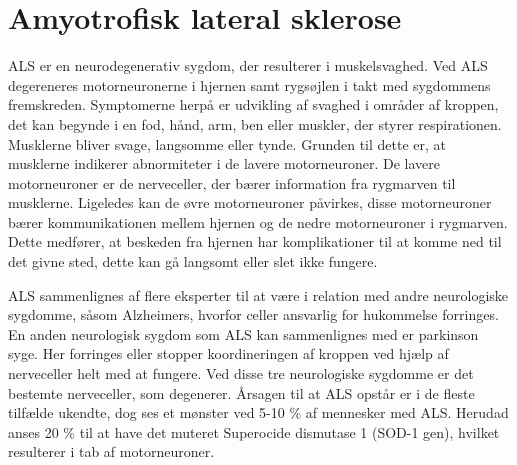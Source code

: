 \chapter{Amyotrofisk lateral sklerose}
ALS er en neurodegenerativ sygdom, der resulterer i muskelsvaghed. Ved ALS degereneres motorneuronerne i hjernen samt rygsøjlen i takt med sygdommens fremskreden. Symptomerne herpå er udvikling af svaghed i områder af kroppen, det kan begynde i en fod, hånd, arm, ben eller muskler, der styrer respirationen. Musklerne bliver svage, langsomme eller tynde. Grunden til dette er, at musklerne indikerer abnormiteter i de lavere motorneuroner. De lavere motorneuroner er de nerveceller, der bærer information fra rygmarven til musklerne. 
Ligeledes kan de øvre motorneuroner påvirkes, disse motorneuroner bærer kommunikationen mellem hjernen og de nedre motorneuroner i rygmarven. Dette medfører, at beskeden fra hjernen har komplikationer til at komme ned til det givne sted, dette kan gå langsomt eller slet ikke fungere. 

ALS sammenlignes af flere eksperter til at være i relation med andre neurologiske sygdomme, såsom Alzheimers, hvorfor celler ansvarlig for hukommelse forringes. En anden neurologisk sygdom som ALS kan sammenlignes med er parkinson syge. Her forringes eller stopper koordineringen af kroppen ved hjælp af nerveceller helt med at fungere. Ved disse tre neurologiske sygdomme er det bestemte nerveceller, som degenerer. 
Årsagen til at ALS opstår er i de fleste tilfælde ukendte, dog ses et mønster ved 5-10 \% af mennesker med ALS. Herudad anses 20 \% til at have det muteret Superocide dismutase 1 (SOD-1 gen), hvilket resulterer i tab af motorneuroner. 


